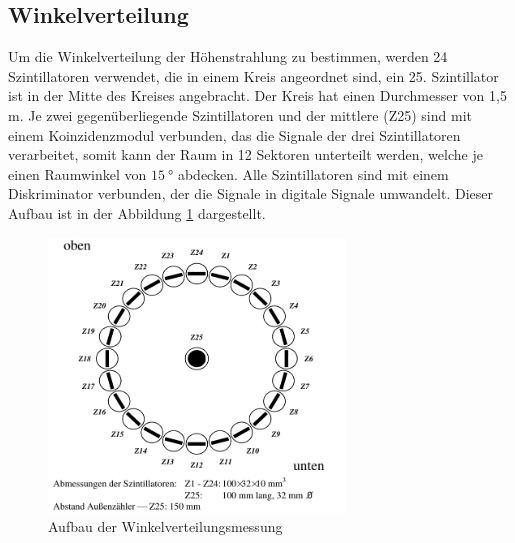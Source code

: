 \documentclass{article}
\begin{document}
\subsection{Winkelverteilung}
Um die Winkelverteilung der Höhenstrahlung zu bestimmen, werden 24 Szintillatoren verwendet, die in einem Kreis angeordnet sind, ein 25. Szintillator ist in der Mitte des Kreises angebracht.
Der Kreis hat einen Durchmesser von 1,5 m.
Je zwei gegenüberliegende Szintillatoren und der mittlere (Z25) sind mit einem Koinzidenzmodul verbunden, das die Signale der drei Szintillatoren verarbeitet, somit kann der Raum in 12 Sektoren unterteilt werden, 
welche je einen Raumwinkel von $\SI{15}{\degree}$ abdecken.
Alle Szintillatoren sind mit einem Diskriminator verbunden, der die Signale in digitale Signale umwandelt.
Dieser Aufbau ist in der Abbildung \ref{fig:AufbauWinkelverteilung} dargestellt.
\begin{figure}[H]
    \centering
    \includegraphics[width=0.7\textwidth]{figures/Aufbau_Winkelverteilung.png}
    \caption{Aufbau der Winkelverteilungsmessung\cite{Anleitung}}
    \label{fig:AufbauWinkelverteilung}
\end{figure}
\end{document}
